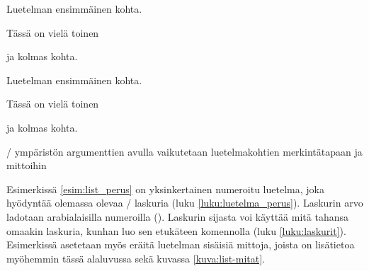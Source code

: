 \begin{esimerkki*}

\begin{koodilohko}
\begin{list}{)}{
    \setlength{\leftmargin}{1.5em} %
    \setlength{\itemsep}{.2ex}     %
    \setlength{\parsep}{0ex}       %
  }
\item Luetelman ensimmäinen kohta.
\item Tässä on vielä toinen
\item ja kolmas kohta.
\end{list}
\end{koodilohko}
  \begin{tulos}
    \vspace*{-1.7ex}%
    \begin{list}{)}{
        \setlength{\leftmargin}{1.5em} %
        \setlength{\itemsep}{.2ex}     %
        \setlength{\parsep}{0ex}       %
      }
    \item Luetelman ensimmäinen kohta.
    \item Tässä on vielä toinen
    \item ja kolmas kohta.
    \end{list}
  \end{tulos}
  \caption{\-/ ympäristön argumenttien avulla vaikutetaan
    luetelmakohtien merkintätapaan ja mittoihin}
  \label{esim:list_perus}
\end{esimerkki*}

Esimerkissä \ref{esim:list_perus} on yksinkertainen numeroitu luetelma,
joka hyödyntää olemassa olevaa \-/ laskuria (luku
\ref{luku:luetelma_perus}). Laskurin arvo ladotaan arabialaisilla
numeroilla (). Laskurin  sijasta voi
käyttää mitä tahansa omaakin laskuria, kunhan luo sen etukäteen
komennolla  (luku \ref{luku:laskurit}). Esimerkissä
asetetaan myös eräitä luetelman sisäisiä mittoja, joista on lisätietoa
myöhemmin tässä alaluvussa sekä kuvassa \ref{kuva:list-mitat}.

